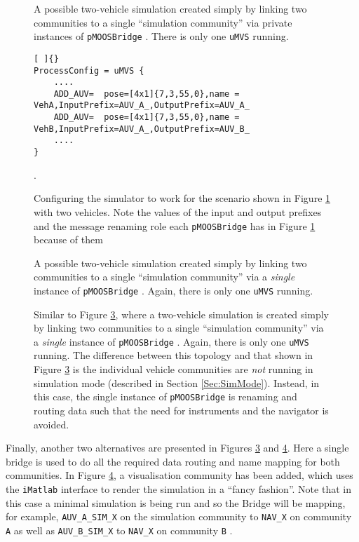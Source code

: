 \documentclass[a4paper,10pt]{article}
\newcommand{\Code}[1]{\texttt{#1} }
\newcommand{\code}[1]{\Code{#1} }
\begin{document}
\begin{figure}[ht]
\centering {}
\caption{A possible two-vehicle simulation created simply by
linking two communities to a single ``simulation community'' via
private instances of \code{pMOOSBridge}. There is only one
\code{uMVS} running.
 }\label{fig:MultiSim2}
\end{figure}

\begin{figure}[ht]
\begin{lstlisting}[ ]{}
ProcessConfig = uMVS {
    ....
    ADD_AUV=  pose=[4x1]{7,3,55,0},name = VehA,InputPrefix=AUV_A_,OutputPrefix=AUV_A_
    ADD_AUV=  pose=[4x1]{7,3,55,0},name = VehB,InputPrefix=AUV_A_,OutputPrefix=AUV_B_
    ....
}
\end{lstlisting}
\caption{Configuring the simulator to work for the scenario shown
in Figure \ref{fig:MultiSim2} with two vehicles. Note the values
of the input and output prefixes and the message renaming role
each \code{pMOOSBridge} has in Figure \ref{fig:MultiSim2} because
of them }.\label{fig:2AUVBlock}
\end{figure}



\begin{figure}[ht]
\centering {}
\caption{A possible two-vehicle simulation created simply by
linking two communities to a single ``simulation community'' via a
{\emph{single}} instance of \code{pMOOSBridge}. Again, there is
only one \code{uMVS} running.
 }\label{fig:MultiSim3}
 \end{figure}

\begin{figure}[ht]
\centering {}
\caption{Similar to Figure \ref{fig:MultiSim3}, where a two-vehicle
simulation is created simply by linking two communities to a
single ``simulation community'' via a {\emph{single}} instance of
\code{pMOOSBridge}. Again, there is only one \code{uMVS} running.
The difference between this topology and that shown in Figure
\ref{fig:MultiSim3} is the individual vehicle communities are
{\emph{not}} running in simulation mode (described in Section
\ref{Sec:SimMode}). Instead, in this case, the single instance of
\code{pMOOSBridge} is renaming and routing data such that the need
for instruments and the navigator is avoided.
 }\label{fig:MultiSim4}
 \end{figure}
Finally, another two alternatives are presented in Figures
\ref{fig:MultiSim3} and \ref{fig:MultiSim4}. Here a single bridge
is used to do all the required data routing and name mapping for
both communities. In Figure \ref{fig:MultiSim4}, a visualisation
community has been added, which uses the \code{iMatlab} interface
to render the simulation in a ``fancy fashion''. Note that in this
case a minimal simulation is being run and so the Bridge will be
mapping, for example, \code{AUV\_A\_SIM\_X} on the simulation
community to \code{NAV\_X} on community \code{A} as well as
\code{AUV\_B\_SIM\_X} to \code{NAV\_X} on community \code{B}.
\end{document}
